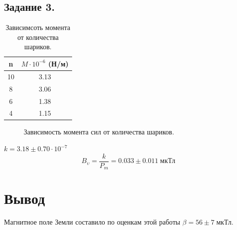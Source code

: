 \documentclass[a4paper,12pt]{article} %
\begin{document}
\subsection{Задание 3.}

\begin{table}[H]
\caption{\label{tab:canonsummary} Зависимсоть момента от количества шариков.}
\begin{center}
\begin{tabular}{|c|c|}
\hline
n & $M \cdot 10^{-6}$ (Н/м)\\
\hline
10 & 3.13\\
\hline
8 & 3.06\\
\hline
6 & 1.38\\
\hline
4 & 1.15\\
\hline
\end{tabular}
\end{center}
\label{table1:ref}
\end{table}

\begin{figure}[H]
\noindent{}
\caption{Зависимость момента сил от количества шариков.}
\label{pic4:ref}
\end{figure}

$k = 3.18 \pm 0.70 \cdot 10^{-7}$\\
$$B_\upsilon = \frac{k}{P_m} = 0.033 \pm 0.011\;\text{мкТл}$$

\section{Вывод}

Магнитное поле Земли составило по оценкам этой работы $\beta = 56\pm 7\;$мкТл.
\end{document}
